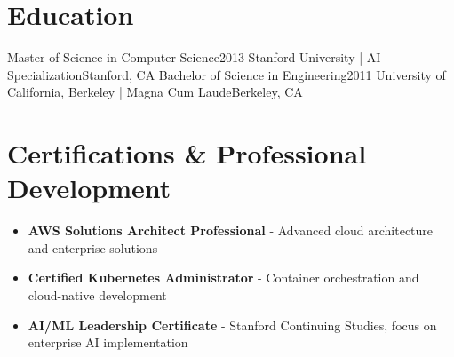 
\section{Education}
\cvheadingstart
  \cvheading
    {Master of Science in Computer Science}{2013}
    {Stanford University | AI Specialization}{Stanford, CA}
  \cvheading
    {Bachelor of Science in Engineering}{2011}
    {University of California, Berkeley | Magna Cum Laude}{Berkeley, CA}
\cvheadingend

\section{Certifications \& Professional Development}
\small{
\begin{itemize}[leftmargin=0in, label={}]
  \item \textbf{AWS Solutions Architect Professional} - Advanced cloud architecture and enterprise solutions
  \item \textbf{Certified Kubernetes Administrator} - Container orchestration and cloud-native development
  \item \textbf{AI/ML Leadership Certificate} - Stanford Continuing Studies, focus on enterprise AI implementation
\end{itemize}
}